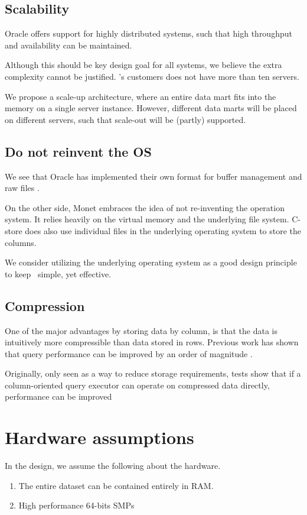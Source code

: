 \subsection{Scalability}
\label{sub:Scalability}
Oracle offers support for highly distributed systems, such that high throughput and availability can be maintained.

Although this should be key design goal for all systems, we believe the extra complexity cannot be justified. \genus 's customers does not have more than ten servers.

We propose a scale-up architecture, where an entire data mart fits into the memory on a single server instance. However, different data marts will be placed on different servers, such that scale-out will be (partly) supported.

\subsection{Do not reinvent the OS}
\label{sub:Do not reinvent the OS}
We see that Oracle has implemented their own format for buffer management and raw files .

On the other side, Monet embraces the idea of not re-inventing the operation system. It relies heavily on the virtual memory and the underlying file system. C-store does also use individual files in the underlying operating system to store the columns.

We consider utilizing the underlying operating system as a good design principle to keep \projectName~simple, yet effective.

\subsection{Compression}
\label{sub:Compression}
One of the major advantages by storing data by column, is that the data is intuitively more compressible than data stored in rows. Previous work has shown that query performance can be improved by an order of magnitude \cite{Abadi2006-bf}.

Originally, only seen as a way to reduce storage requirements, tests show that if a column-oriented query executor can operate on compressed data directly, performance can be improved \cite{Abadi2008-dd}


\section{Hardware assumptions}
In the design, we assume the following about the hardware.
\begin{enumerate}
  \item The entire dataset can be contained entirely in RAM.
  \item High performance 64-bits SMPs
\end{enumerate}


